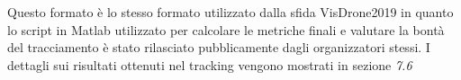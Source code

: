 Questo formato è lo stesso formato utilizzato dalla sfida VisDrone2019\cite{dronechallenge} in quanto lo script in Matlab utilizzato per calcolare le metriche finali e valutare la bontà del tracciamento è stato rilasciato pubblicamente dagli organizzatori stessi. I dettagli sui risultati ottenuti nel tracking vengono mostrati in sezione \textit{7.6}

